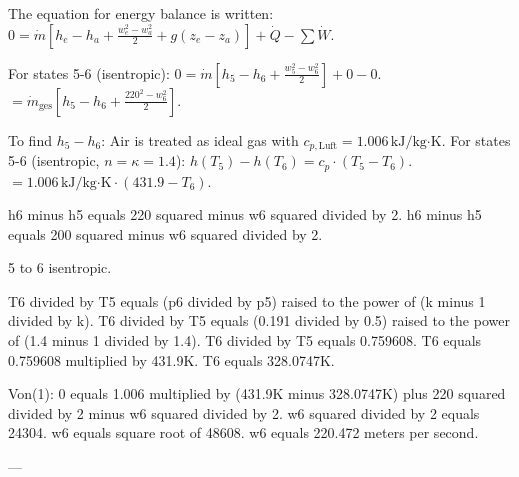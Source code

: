 The equation for energy balance is written:  
\( 0 = \dot{m} \left[ h_e - h_a + \frac{w_e^2 - w_a^2}{2} + g(z_e - z_a) \right] + \dot{Q} - \sum \dot{W} \).  

For states 5-6 (isentropic):  
\( 0 = \dot{m} \left[ h_5 - h_6 + \frac{w_5^2 - w_6^2}{2} \right] + 0 - 0 \).  
\( = \dot{m}_{\text{ges}} \left[ h_5 - h_6 + \frac{220^2 - w_6^2}{2} \right] \).  

To find \( h_5 - h_6 \):  
Air is treated as ideal gas with \( c_{p,\text{Luft}} = 1.006 \, \text{kJ/kg·K} \).  
For states 5-6 (isentropic, \( n = \kappa = 1.4 \)):  
\( h(T_5) - h(T_6) = c_p \cdot (T_5 - T_6) \).  
\( = 1.006 \, \text{kJ/kg·K} \cdot (431.9 - T_6) \).

h6 minus h5 equals 220 squared minus w6 squared divided by 2.  
h6 minus h5 equals 200 squared minus w6 squared divided by 2.  

5 to 6 isentropic.  

T6 divided by T5 equals (p6 divided by p5) raised to the power of (k minus 1 divided by k).  
T6 divided by T5 equals (0.191 divided by 0.5) raised to the power of (1.4 minus 1 divided by 1.4).  
T6 divided by T5 equals 0.759608.  
T6 equals 0.759608 multiplied by 431.9K.  
T6 equals 328.0747K.  

Von(1):  
0 equals 1.006 multiplied by (431.9K minus 328.0747K) plus 220 squared divided by 2 minus w6 squared divided by 2.  
w6 squared divided by 2 equals 24304.  
w6 equals square root of 48608.  
w6 equals 220.472 meters per second.  

---